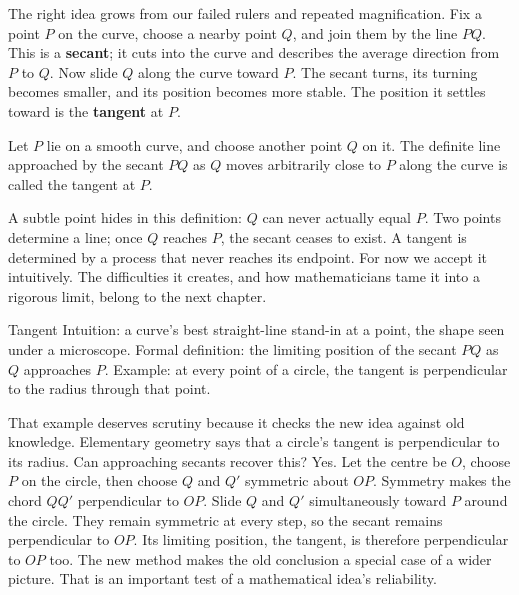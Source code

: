 The right idea grows from our failed rulers and repeated magnification. Fix a point $P$ on the curve, choose a nearby point $Q$, and join them by the line $PQ$. This is a \textbf{secant}; it cuts into the curve and describes the average direction from $P$ to $Q$. Now slide $Q$ along the curve toward $P$. The secant turns, its turning becomes smaller, and its position becomes more stable. The position it settles toward is the \textbf{tangent} at $P$.

\begin{center}
\end{center}

\begin{dingyi}
Let $P$ lie on a smooth curve, and choose another point $Q$ on it. The definite line approached by the secant $PQ$ as $Q$ moves arbitrarily close to $P$ along the curve is called the tangent at $P$.
\end{dingyi}

A subtle point hides in this definition: $Q$ can never actually equal $P$. Two points determine a line; once $Q$ reaches $P$, the secant ceases to exist. A tangent is determined by a process that never reaches its endpoint. For now we accept it intuitively. The difficulties it creates, and how mathematicians tame it into a rigorous limit, belong to the next chapter.

\begin{shuyu}{Tangent}
Intuition: a curve's best straight-line stand-in at a point, the shape seen under a microscope. Formal definition: the limiting position of the secant $PQ$ as $Q$ approaches $P$. Example: at every point of a circle, the tangent is perpendicular to the radius through that point.
\end{shuyu}

That example deserves scrutiny because it checks the new idea against old knowledge. Elementary geometry says that a circle's tangent is perpendicular to its radius. Can approaching secants recover this? Yes. Let the centre be $O$, choose $P$ on the circle, then choose $Q$ and $Q'$ symmetric about $OP$. Symmetry makes the chord $QQ'$ perpendicular to $OP$. Slide $Q$ and $Q'$ simultaneously toward $P$ around the circle. They remain symmetric at every step, so the secant remains perpendicular to $OP$. Its limiting position, the tangent, is therefore perpendicular to $OP$ too. The new method makes the old conclusion a special case of a wider picture. That is an important test of a mathematical idea's reliability.

